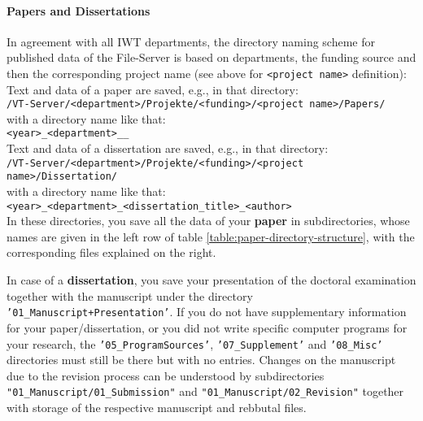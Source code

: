 \paragraph{Papers and Dissertations}

\noindent In agreement with all IWT departments, the directory naming scheme for
published data of the File-Server is based on departments, the funding source
and then the corresponding project name (see above for \texttt{<project name>}
definition):
\\
Text and data of a paper are saved, e.g., in that directory:  \\
\texttt{/VT-Server/<department>/Projekte/<funding>/<project name>/Papers/} \\
with a directory name like that:
\\
\texttt{<year>\_<department>\_<paper-name>\_<first author>} \\
Text and data of a dissertation are saved, e.g., in that directory:
\\
\texttt{/VT-Server/<department>/Projekte/<funding>/<project name>/Dissertation/} \\
with a directory name like that:
\\
\texttt{<year>\_<department>\_<dissertation\_title>\_<author>} \\
In these directories, you save all the data of your \textbf{paper} in
subdirectories, whose names are given in the left row of table
\ref{table:paper-directory-structure}, with the corresponding
files explained on the right.
\begin{table}[!h]
  \caption{%
  The data of every paper has to be saved in eight subdirectories;
  further remarks: \\
  **When the paper is ready for press the corresponding author loads the last and
  revised version (i.e. only the real used but absolutely complete data) into
  the protected directory \\
  ***If the data reproduced in a figure/table is from distributed primary data
  directories, it is sufficient to save here only the generating program%
  }

\label{table:paper-directory-structure}
\end{table}

In case of a \textbf{dissertation}, you save your presentation of the doctoral examination together with the manuscript under the directory \texttt{'01\_Manuscript+Presentation'}. If you do not have supplementary information for your paper/dissertation, or you did not write specific computer programs for your research, the \texttt{'05\_ProgramSources'}, \texttt{'07\_Supplement'} and \texttt{'08\_Misc'} directories must still be
there but with no entries. Changes on the manuscript due to the revision process can be understood by subdirectories \texttt{"01\_Manuscript/01\_Submission"} and \texttt{"01\_Manuscript/02\_Revision"} together with storage of the respective manuscript and rebbutal files.

